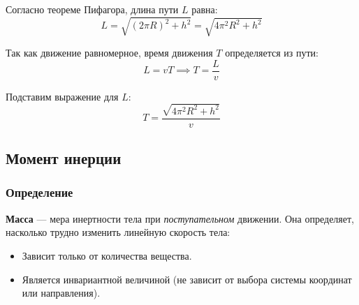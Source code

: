\begin{center}
\end{center}

Согласно теореме Пифагора, длина пути $L$ равна:
\[
    L = \sqrt{(2\pi R)^2 + h^2} = \sqrt{4\pi^2 R^2 + h^2}
\]

Так как движение равномерное, время движения $T$ определяется из пути:
\[
    L=vT\implies T = \frac{L}{v}
\]

Подставим выражение для $L$:
\[\boxed{T = \frac{\sqrt{4\pi^2 R^2 + h^2}}{v}
}\]

\subsection{Момент инерции}

\subsubsection{Определение}

\textbf{Масса} --- мера инертности тела при \textit{поступательном} движении. Она определяет, насколько трудно изменить линейную скорость тела:
\begin{itemize}
    \item Зависит только от количества вещества.
    \item Является инвариантной величиной (не зависит от выбора системы координат или направления).
\end{itemize}

